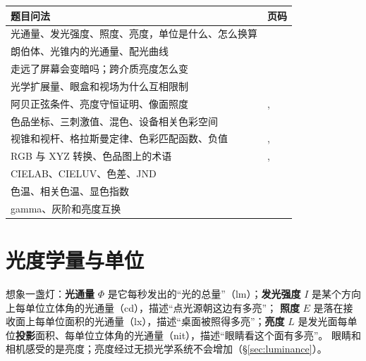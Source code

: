 \begin{center}
\renewcommand{\arraystretch}{1.18}
\begin{tabular}{@{}P{0.62\textwidth}P{0.14\textwidth}@{}}
\toprule
题目问法 & 页码\\ \midrule
光通量、发光强度、照度、亮度，单位是什么、怎么换算 & \pageref{sec:photounits}\\
朗伯体、光锥内的光通量、配光曲线 & \pageref{sec:lambert}\\
走远了屏幕会变暗吗；跨介质亮度怎么变 & \pageref{sec:lumprop}\\
光学扩展量、眼盒和视场为什么互相限制 & \pageref{sec:etendue}\\
阿贝正弦条件、亮度守恒证明、像面照度 & \pageref{sec:abbesine}, \pageref{sec:luminance}\\
色品坐标、三刺激值、混色、设备相关色彩空间 & \pageref{sec:color}\\
视锥和视杆、格拉斯曼定律、色彩匹配函数、负值 & \pageref{sec:colorbio}, \pageref{sec:colormatch}\\
RGB 与 XYZ 转换、色品图上的术语 & \pageref{sec:rgb2xyz}, \pageref{sec:chromadiagram}\\
CIELAB、CIELUV、色差、JND & \pageref{sec:lab}\\
色温、相关色温、显色指数 & \pageref{sec:cctcri}\\
gamma、灰阶和亮度互换 & \pageref{sec:gammacalc}\\
\bottomrule
\end{tabular}
\end{center}

\section{光度学量与单位}\label{sec:photounits}
\begin{idea}[四个量怎么区分]
想象一盏灯：\textbf{光通量} $\Phi$ 是它每秒发出的“光的总量”（lm）；\textbf{发光强度} $I$ 是某个方向上每单位立体角的光通量（cd），描述“点光源朝这边有多亮”；
\textbf{照度} $E$ 是落在接收面上每单位面积的光通量（lx），描述“桌面被照得多亮”；\textbf{亮度} $L$ 是发光面每单位\textbf{投影}面积、每单位立体角的光通量（nit），描述“眼睛看这个面有多亮”。
眼睛和相机感受的是亮度；亮度经过无损光学系统不会增加（§\ref{sec:luminance}）。
\end{idea}

